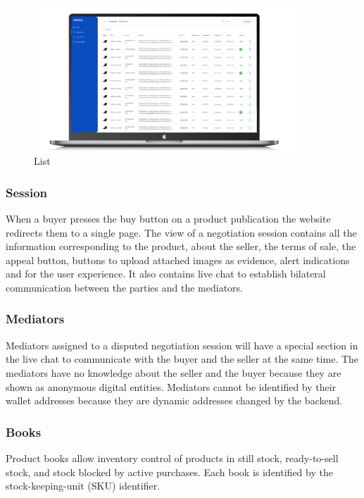 \documentclass[12pt]{article}
\begin{document}
\begin{figure}[ht]
  \centering
  \includegraphics[width=0.88\textwidth, keepaspectratio]{product-list.png}
  \caption{List}
  \label{fig:web}
\end{figure}

\subsubsection { Session } 

When a buyer presses the buy button on a product publication the website redirects them to a single page. The view of a negotiation session contains all the information corresponding to the product, about the seller, the terms of sale, the appeal button, buttons to upload attached images as evidence, alert indications and for the user experience. It also contains live chat to establish bilateral communication between the parties and the mediators.

\subsubsection { Mediators } 

Mediators assigned to a disputed negotiation session will have a special section in the live chat to communicate with the buyer and the seller at the same time. The mediators have no knowledge about the seller and the buyer because they are shown as anonymous digital entities. Mediators cannot be identified by their wallet addresses because they are dynamic addresses changed by the backend.

\subsubsection { Books } 

Product books allow inventory control of products in still stock, ready-to-sell stock, and stock blocked by active purchases. Each book is identified by the stock-keeping-unit (SKU) identifier.
\end{document}
